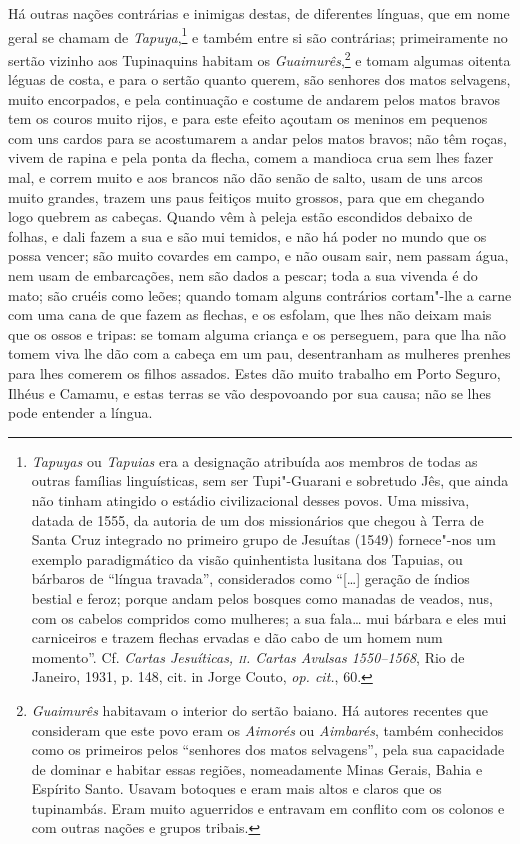 \begin{linenumbers}
 Há outras nações contrárias e inimigas destas, de diferentes línguas,
que em nome geral se chamam de \textit{Tapuya},\footnote{ \textit{Tapuyas} 
ou \textit{Tapuias} era a designação atribuída aos
membros de todas as outras famílias linguísticas, sem ser Tupi"-Guarani
e sobretudo Jês, que ainda não tinham atingido o estádio
civilizacional desses povos. Uma missiva, datada de 1555, da autoria
de um dos missionários que chegou à Terra de Santa Cruz integrado no
primeiro grupo de Jesuítas (1549) fornece"-nos um exemplo paradigmático
da visão quinhentista lusitana dos Tapuias, ou bárbaros de ``língua
travada'', considerados como ``[\ldots{}] geração de índios bestial e feroz;
porque andam pelos bosques como manadas de veados, nus, com os cabelos
compridos como mulheres; a sua fala\ldots{} mui bárbara e eles mui
carniceiros e trazem flechas ervadas e dão cabo de um homem num
momento''. Cf. \textit{Cartas Jesuíticas, \textsc{ii}. Cartas Avulsas
1550--1568}, Rio de Janeiro, 1931, p. 148, cit. in Jorge Couto,
\textit{op. cit.}, 60.} e também entre si são contrárias;
primeiramente no sertão vizinho aos Tupinaquins habitam os
\textit{Guaimurês},\footnote{ \textit{Guaimurês} habitavam o
interior do sertão baiano. Há autores recentes que consideram que este
povo eram os \textit{Aimorés} ou \textit{Aimbarés}, também conhecidos
como os primeiros pelos ``senhores dos matos selvagens'', pela sua
capacidade de dominar e habitar essas regiões, nomeadamente Minas
Gerais, Bahia e Espírito Santo. Usavam botoques e eram mais altos e
claros que os tupinambás. Eram muito aguerridos e entravam em conflito
com os colonos e com outras nações e grupos tribais.} e tomam
algumas oitenta léguas de costa, e para o sertão quanto querem, são
senhores dos matos selvagens, muito encorpados, e pela continuação e
costume de andarem pelos matos bravos tem os couros muito rijos, e para
este efeito açoutam os meninos em pequenos com uns cardos para se
acostumarem a andar pelos matos bravos; não têm roças, vivem de rapina
e pela ponta da flecha, comem a mandioca crua sem lhes fazer mal, e
correm muito e aos brancos não dão senão de salto, usam de uns arcos
muito grandes, trazem uns paus feitiços muito grossos, para que em
chegando logo quebrem as cabeças. Quando vêm à peleja estão escondidos
debaixo de folhas, e dali fazem a sua e são mui temidos, e não há poder
no mundo que os possa vencer; são muito covardes em campo, e não ousam
sair, nem passam água, nem usam de embarcações, nem são dados a pescar;
toda a sua vivenda é do mato; são cruéis como leões; quando tomam
alguns contrários cortam"-lhe a carne com uma cana de que fazem as
flechas, e os esfolam, que lhes não deixam mais que os ossos e tripas:
se tomam alguma criança e os perseguem, para que lha não tomem viva lhe
dão com a cabeça em um pau, desentranham as mulheres prenhes para lhes
comerem os filhos assados. Estes dão muito trabalho em Porto Seguro,
Ilhéus e Camamu, e estas terras se vão despovoando por sua causa; não
se lhes pode entender a língua. 


\end{linenumbers}
